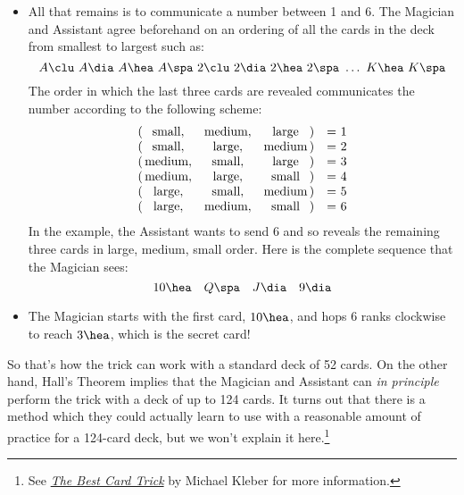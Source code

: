 \begin{itemize}
\begin{itemize}
\end{itemize}

\item All that remains is to communicate a number between 1 and 6.
The Magician and Assistant agree beforehand on an ordering of all the
cards in the deck from smallest to largest such as:
%
\[
A \clu\  A \dia\  A \hea\ A \spa\
2 \clu\  2 \dia\  2 \hea\ 2 \spa\
\dots\ K \hea\ K \spa
\]
%
The order in which the last three cards are revealed communicates the
number according to the following scheme:
%
\[
\begin{array}{r@{\,}ccc@{\,}ll}
(&\text{small},&\text{medium},&\text{large}&) & ${}= 1$ \\
(&\text{small},&\text{large},&\text{medium}&) & ${}= 2$ \\
(&\text{medium},&\text{small},&\text{large}&) & ${}= 3$ \\
(&\text{medium},&\text{large},&\text{small}&) & ${}= 4$ \\
(&\text{large},&\text{small},&\text{medium}&) & ${}= 5$ \\
(&\text{large},&\text{medium},&\text{small}&) & ${}= 6$
\end{array}
\]
%
In the example, the Assistant wants to send 6 and so reveals the
remaining three cards in large, medium, small order.  Here is the
complete sequence that the Magician sees:
%
\[
10 \hea \quad Q \spa \quad J \dia \quad 9 \dia
\]

\item The Magician starts with the first card, $10 \hea$, and hops 6
ranks clockwise to reach $3 \hea$, which is the secret card!

\end{itemize}

So that's how the trick can work with a standard deck of 52 cards.  On
the other hand, Hall's Theorem implies that the Magician and Assistant
can \emph{in principle} perform the trick with a deck of up to 124
cards.  It turns out that there is a method which they could actually
learn to use with a reasonable amount of practice for a 124-card deck,
but we won't explain it here.\footnote{See
  \href{http://courses.csail.mit.edu/6.042/spring11/Kleber-cardTrick.pdf}{\emph{The
      Best Card Trick}} by Michael Kleber for more information.}
\fi  %

\iffalse
Also, \emph{Using a Card Trick to Teach Discrete Mathematics}, Simonson,
Shai, Holm, Tara S., Primus: Problems, Resources, and Issues in
Mathematics Undergraduate Studies, Sep 2003.
\fi

